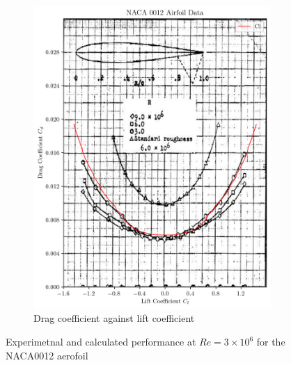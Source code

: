 \documentclass{article}
\begin{document}
\begin{figure}[H]
\begin{subfigure}{0.45\textwidth}
        \includegraphics[width=0.99\textwidth]{figures/NACA0012_drag_validation.png}
        \caption{Drag coefficient against lift coefficient}
        \label{fig:0012_drag_validation}
    \end{subfigure}
    \caption{Experimetnal and calculated performance at $Re = 3\times10^6$ for the NACA0012 aerofoil \cite{theory_wing_sections}}
\end{figure}
\end{document}
